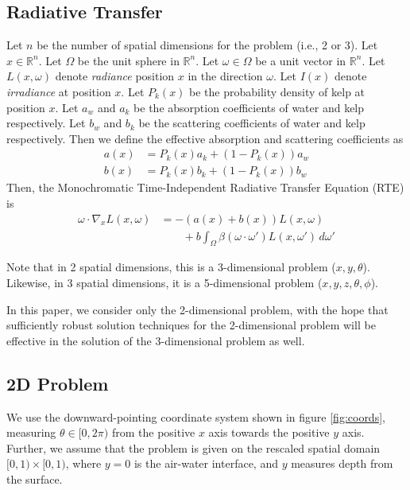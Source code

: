 \documentclass[10pt]{article}
\newcommand\RR{\mathbb{R}}
\begin{document}
\begin{multicols}{2}
\subsection{Radiative Transfer}
Let $n$ be the number of spatial dimensions for the problem (i.e., 2 or 3).
Let $x \in \RR^n$.
Let $\Omega$ be the unit sphere in $\RR^n$.
Let $\omega \in \Omega$ be a unit vector in $\RR^n$.
Let $L(x,\omega)$ denote \textit{radiance} position $x$ in the direction $\omega$.
Let $I(x)$ denote \textit{irradiance} at position $x$.
Let $P_k(x)$ be the probability density of kelp at position $x$.
Let $a_w$ and $a_k$ be the absorption coefficients of water and kelp respectively.
Let $b_w$ and $b_k$ be the scattering coefficients of water and kelp respectively.
Then we define the effective absorption and scattering coefficients as
\begin{align}
	\label{eq:abs}
	a(x) &= P_k(x) a_k + (1-P_k(x)) a_w \\
	\label{eq:sct}
	b(x) &= P_k(x) b_k + (1-P_k(x)) b_w
\end{align}
Then, the Monochromatic Time-Independent Radiative Transfer Equation (RTE) is
\begin{equation}
    \tag{RTE}
    \label{eq:rte}
    \begin{aligned}
        \omega \cdot \nabla_x L(x,\omega) &= -(a(x) + b(x)) L(x,\omega) \\
        &\qquad + b \int_\Omega \beta(\omega \cdot \omega') L(x,\omega')\, d\omega'
    \end{aligned}
\end{equation}

Note that in 2 spatial dimensions, this is a 3-dimensional problem ($x,y,\theta$).
Likewise, in 3 spatial dimensions, it is a 5-dimensional problem ($x,y,z,\theta,\phi$).

In this paper, we consider only the 2-dimensional problem, with the hope that sufficiently robust solution techniques for the 2-dimensional problem will be effective in the solution of the 3-dimensional problem as well.

\subsection{2D Problem}
\label{sec:2d}
We use the downward-pointing coordinate system shown in figure \ref{fig:coords}, measuring $\theta \in [0,2\pi)$ from the positive $x$ axis towards the positive $y$ axis.
Further, we assume that the problem is given on the rescaled spatial domain $[0,1) \times [0,1)$, where $y=0$ is the air-water interface, and $y$ measures depth from the surface.


\end{multicols}
\end{document}
